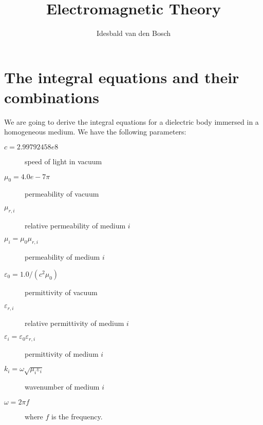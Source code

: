 \documentclass[a4paper,10pt]{book}
\title{Electromagnetic Theory}
\author{Idesbald van den Bosch}
\begin{document}
\maketitle
\tableofcontents


\chapter{The integral equations and their combinations}
%
\par
We are going to derive the integral equations for a dielectric body immersed in a homogeneous medium. We have the following parameters:
\begin{description}
\item [$c = 2.99792458e8$] speed of light in vacuum
\item [$\mu_0 = 4.0e-7 \pi$] permeability of vacuum
\item [$\mu_{r, i}$] relative permeability of medium $i$
\item [$\mu_i = \mu_0\mu_{r, i}$] permeability of medium $i$
\item [$\varepsilon_0 = 1.0/(c^2 \mu_0)$] permittivity of vacuum
\item [$\varepsilon_{r, i}$] relative permittivity of medium $i$
\item [$\varepsilon_i = \varepsilon_0\varepsilon_{r, i}$] permittivity of medium $i$
\item [$k_i = \omega \sqrt{\mu_i \varepsilon_i}$] wavenumber of medium $i$ 
\item [$\omega = 2 \pi f$] where $f$ is the frequency.
\end{description}
\end{document}
